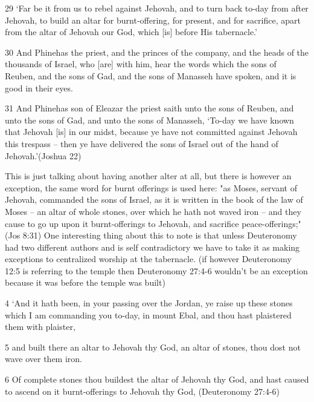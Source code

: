 \documentclass[11pt]{article}
\begin{document}
29 `Far be it from us to rebel against Jehovah, and to turn back to-day from after Jehovah, to build an altar for burnt-offering, for present, and for sacrifice, apart from the altar of Jehovah our God, which [is] before His tabernacle.'

30 And Phinehas the priest, and the princes of the company, and the heads of the thousands of Israel, who [are] with him, hear the words which the sons of Reuben, and the sons of Gad, and the sons of Manasseh have spoken, and it is good in their eyes.

31 And Phinehas son of Eleazar the priest saith unto the sons of Reuben, and unto the sons of Gad, and unto the sons of Manasseh, `To-day we have known that Jehovah [is] in our midst, because ye have not committed against Jehovah this trespass -- then ye have delivered the sons of Israel out of the hand of Jehovah.'(Joshua 22)

This is just talking about having another alter at all, but there is however an exception, the same word for burnt offerings is used here:
"as Moses, servant of Jehovah, commanded the sons of Israel, as it is written in the book of the law of Moses -- an altar of whole stones, over which he hath not waved iron -- and they cause to go up upon it burnt-offerings to Jehovah, and sacrifice peace-offerings;" (Jos 8:31) One interesting thing about this to note is that unless Deuteronomy had two different authors and is self contradictory we have to take it as making exceptions to centralized worship at the tabernacle. (if however Deuteronomy 12:5 is referring to the temple then Deuteronomy 27:4-6 wouldn't be an exception because it was before the temple was built)

4 `And it hath been, in your passing over the Jordan, ye raise up these stones which I am commanding you to-day, in mount Ebal, and thou hast plaistered them with plaister,

5 and built there an altar to Jehovah thy God, an altar of stones, thou dost not wave over them iron.

6 Of complete stones thou buildest the altar of Jehovah thy God, and hast caused to ascend on it burnt-offerings to Jehovah thy God,
(Deuteronomy 27:4-6)
\end{document}
